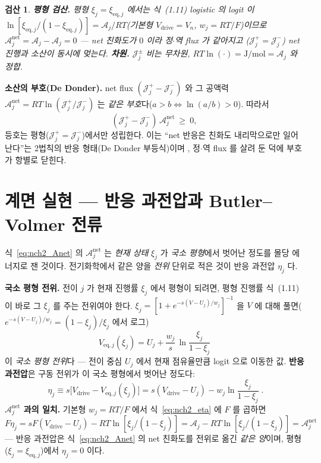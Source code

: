 \documentclass[11pt,a4paper]{article}
\newtheorem*{verifybox}{검산}
\newcommand{\eq}{\mathrm{eq}}
\newcommand{\drive}{\mathrm{drive}}
\begin{document}
\begin{verifybox}
\textbf{평형 검산.} 평형 $\xi_j=\xi_{\eq,j}$ 에서는 식~(1.11) logistic 의 logit 이
$\ln[\xi_{\eq,j}/(1-\xi_{\eq,j})]=\mathcal A_j/RT$(기본형 $V_\drive=V_n$, $w_j=RT/F$)이므로
$\mathcal A_j^{\mathrm{net}}=\mathcal A_j-\mathcal A_j=0$ — net 친화도가 $0$ 이라 정$\cdot$역 flux 가 같아지고
($\mathcal J_j^+=\mathcal J_j^-$) net 진행과 소산이 동시에 멎는다. \textbf{차원.} $\mathcal J_j^\pm$ 비는 무차원,
$RT\ln(\cdot)=\mathrm{J/mol}=\mathcal A_j$ 와 정합.
\end{verifybox}

\textbf{소산의 부호(De Donder).} net flux $(\mathcal J_j^+-\mathcal J_j^-)$ 와 그 공액력 $\mathcal A_j^{\mathrm{net}}
=RT\ln(\mathcal J_j^+/\mathcal J_j^-)$ 는 \emph{같은 부호}다($a>b\Leftrightarrow\ln(a/b)>0$). 따라서
\begin{equation}
(\mathcal J_j^+-\mathcal J_j^-)\,\mathcal A_j^{\mathrm{net}}\ \ge\ 0,
\label{eq:nch2_dedonder}
\end{equation}
등호는 평형($\mathcal J_j^+=\mathcal J_j^-$)에서만 성립한다. 이는 ``net 반응은 친화도 내리막으로만 일어난다''는
2법칙의 반응 형태(De Donder 부등식)이며 \cite{degrootmazur1962}, 정$\cdot$역 flux 를 살려 둔 덕에 부호가 항별로
닫힌다.

\section{계면 실현 — 반응 과전압과 Butler--Volmer 전류}\label{sec:nch2_bv}
식~\eqref{eq:nch2_Anet} 의 $\mathcal A_j^{\mathrm{net}}$ 는 \emph{현재 상태} $\xi_j$ 가 \emph{국소 평형}에서 벗어난
정도를 몰당 에너지로 잰 것이다. 전기화학에서 같은 양을 \emph{전위} 단위로 적은 것이 반응 과전압 $\eta_j$ 다.

\textbf{국소 평형 전위.} 전이 $j$ 가 현재 진행률 $\xi_j$ 에서 평형이 되려면, 평형 진행률 식~(1.11)이 바로 그 $\xi_j$
를 주는 전위여야 한다. $\xi_j=[1+e^{-s(V-U_j)/w_j}]^{-1}$ 을 $V$ 에 대해 풀면($e^{-s(V-U_j)/w_j}=(1-\xi_j)/\xi_j$
에서 로그)
\begin{equation}
V_{\eq,j}(\xi_j)=U_j+\frac{w_j}{s}\,\ln\frac{\xi_j}{1-\xi_j}
\label{eq:nch2_Veq}
\end{equation}
이 \emph{국소 평형 전위}다 — 전이 중심 $U_j$ 에서 현재 점유율만큼 logit 으로 이동한 값. \textbf{반응 과전압}은
구동 전위가 이 국소 평형에서 벗어난 정도다:
\begin{equation}
\boxed{\;\eta_j\equiv s\big[V_\drive-V_{\eq,j}(\xi_j)\big]
=s(V_\drive-U_j)-w_j\ln\frac{\xi_j}{1-\xi_j}\;.}
\label{eq:nch2_eta}
\end{equation}
\textbf{$\mathcal A_j^{\mathrm{net}}$ 과의 일치.} 기본형 $w_j=RT/F$ 에서 식~\eqref{eq:nch2_eta} 에 $F$ 를 곱하면
$F\eta_j=sF(V_\drive-U_j)-RT\ln[\xi_j/(1-\xi_j)]=\mathcal A_j-RT\ln[\xi_j/(1-\xi_j)]=\mathcal A_j^{\mathrm{net}}$ —
반응 과전압은 식~\eqref{eq:nch2_Anet} 의 net 친화도를 전위로 옮긴 \emph{같은 양}이며, 평형($\xi_j=\xi_{\eq,j}$)에서
$\eta_j=0$ 이다.
\end{document}
